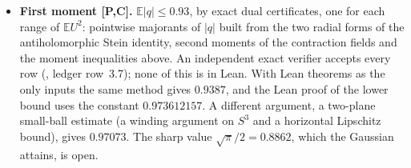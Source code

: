 \documentclass[11pt,a4paper]{article}
\newcommand{\E}{\mathbb{E}}
\begin{document}
\begin{itemize}
\[ \]
 Each budget is certified by two positive semidefinite $2\times2$ Gram matrices of contractions of the coefficient tensor.
\item \textbf{First moment [P,C].} $\E|q|\le0.93$, by exact dual certificates, one for each range of $\E U^2$: pointwise
 majorants of $|q|$ built from the two radial forms of the antiholomorphic Stein identity, second moments of the
 contraction fields and the moment inequalities above. An independent exact verifier accepts every row
 (, ledger row~3.7); none of this is in Lean. With Lean theorems as the only inputs the
 same method gives $0.9387$, and the Lean proof of the lower bound uses the constant $0.973612157$. A different
 argument, a two-plane small-ball estimate (a winding argument on $S^3$ and a horizontal Lipschitz bound), gives
 $0.97073$. The sharp value $\sqrt\pi/2=0.8862$, which the Gaussian attains, is open.
\end{itemize}
\end{document}
